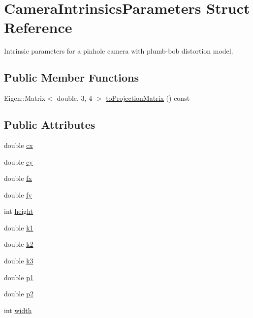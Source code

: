 \hypertarget{structfovis_1_1CameraIntrinsicsParameters}{
\section{CameraIntrinsicsParameters Struct Reference}
\label{structfovis_1_1CameraIntrinsicsParameters}
}


Intrinsic parameters for a pinhole camera with plumb-\/bob distortion model.  


\subsection*{Public Member Functions}
\begin{DoxyCompactItemize}
\item 
Eigen::Matrix$<$ double, 3, 4 $>$ \hyperlink{structfovis_1_1CameraIntrinsicsParameters_ac69fdeedc0b10760b43b6acfa58f6807}{toProjectionMatrix} () const 
\end{DoxyCompactItemize}
\subsection*{Public Attributes}
\begin{DoxyCompactItemize}
\item 
double \hyperlink{structfovis_1_1CameraIntrinsicsParameters_ac176cb816ac192bd8ec2f73c40b43309}{cx}
\item 
double \hyperlink{structfovis_1_1CameraIntrinsicsParameters_a2d6a093e4a6fe06658d3d01563d028c9}{cy}
\item 
double \hyperlink{structfovis_1_1CameraIntrinsicsParameters_aa7e88347476ef454086e7c3cd9865460}{fx}
\item 
double \hyperlink{structfovis_1_1CameraIntrinsicsParameters_a03c4ce20c7e4b8c6d60a20b833be69fe}{fy}
\item 
int \hyperlink{structfovis_1_1CameraIntrinsicsParameters_ad12fc34ce789bce6c8a05d8a17138534}{height}
\item 
double \hyperlink{structfovis_1_1CameraIntrinsicsParameters_a830ffdbe06791ff8f55f8070464e5023}{k1}
\item 
double \hyperlink{structfovis_1_1CameraIntrinsicsParameters_a5fa2323820f58decc76532df11cd3ab8}{k2}
\item 
double \hyperlink{structfovis_1_1CameraIntrinsicsParameters_a514147779f4e2774d6e0887cbf531c95}{k3}
\item 
double \hyperlink{structfovis_1_1CameraIntrinsicsParameters_afe3ec2bbc515ef1c2c03dccf567831f4}{p1}
\item 
double \hyperlink{structfovis_1_1CameraIntrinsicsParameters_afb3d783e05c27da8ea3c53c9d2e17af1}{p2}
\item 
int \hyperlink{structfovis_1_1CameraIntrinsicsParameters_a2474a5474cbff19523a51eb1de01cda4}{width}
\end{DoxyCompactItemize}


